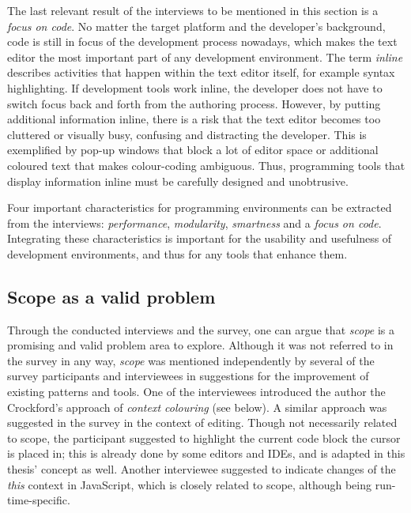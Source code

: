 The last relevant result of the interviews to be mentioned in this
section is a \emph{focus on code}. No matter the target platform and the
developer’s background, code is still in focus of the development
process nowadays, which makes the text editor the most important part of
any development environment. The term \emph{inline} describes activities
that happen within the text editor itself, for example syntax
highlighting. If development tools work inline, the developer does not
have to switch focus back and forth from the authoring process. However,
by putting additional information inline, there is a risk that the text
editor becomes too cluttered or visually busy, confusing and distracting
the developer. This is exemplified by pop-up windows that block a lot of
editor space or additional coloured text that makes colour-coding
ambiguous. Thus, programming tools that display information inline must
be carefully designed and unobtrusive.

Four important characteristics for programming environments can be
extracted from the interviews: \emph{performance}, \emph{modularity},
\emph{smartness} and a \emph{focus on code}. Integrating these
characteristics is important for the usability and usefulness of
development environments, and thus for any tools that enhance them.

\subsection{Scope as a valid problem}\label{scope-as-a-valid-problem}

Through the conducted interviews and the survey, one can argue that
\emph{scope} is a promising and valid problem area to explore. Although
it was not referred to in the survey in any way, \emph{scope} was
mentioned independently by several of the survey participants and
interviewees in suggestions for the improvement of existing patterns and
tools. One of the interviewees introduced the author the Crockford’s
\citeyear{crockford} approach of \emph{context colouring} (see below). A
similar approach was suggested in the survey in the context of editing.
Though not necessarily related to scope, the participant suggested to
highlight the current code block the cursor is placed in; this is
already done by some editors and IDEs, and is adapted in this thesis’
concept as well. Another interviewee suggested to indicate changes of
the \emph{this} context in JavaScript, which is closely related to
scope, although being run-time-specific.

